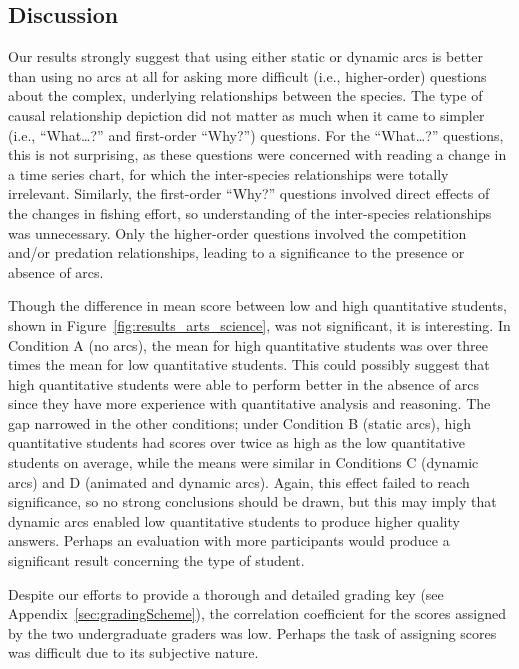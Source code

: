 \subsection{Discussion}

Our results strongly suggest that using either static or dynamic arcs is better than using no arcs at all for asking more difficult (i.e., higher-order) questions about the complex, underlying relationships between the species.  The type of causal relationship depiction did not matter as much when it came to simpler (i.e., ``What\ldots?'' and first-order ``Why?'') questions.  For the ``What\ldots?'' questions, this is not surprising, as these questions were concerned with reading a change in a time series chart, for which the inter-species relationships were totally irrelevant.  Similarly, the first-order ``Why?'' questions involved direct effects of the changes in fishing effort, so understanding of the inter-species relationships was unnecessary.  Only the higher-order questions involved the competition and/or predation relationships, leading to a significance to the presence or absence of arcs.

Though the difference in mean score between low and high quantitative students, shown in Figure~\ref{fig:results_arts_science}, was not significant, it is interesting.  In Condition A (no arcs), the mean for high quantitative students was over three times the mean for low quantitative students.  This could possibly suggest that high quantitative students were able to perform better in the absence of arcs since they have more experience with quantitative analysis and reasoning.  The gap narrowed in the other conditions; under Condition B (static arcs), high quantitative students had scores over twice as high as the low quantitative students on average, while the means were similar in Conditions C (dynamic arcs) and D (animated and dynamic arcs).  Again, this effect failed to reach significance, so no strong conclusions should be drawn, but this may imply that dynamic arcs enabled low quantitative students to produce higher quality answers.  Perhaps an evaluation with more participants would produce a significant result concerning the type of student.

Despite our efforts to provide a thorough and detailed grading key (see Appendix~\ref{sec:gradingScheme}), the correlation coefficient for the scores assigned by the two undergraduate graders was low.  Perhaps the task of assigning scores was difficult due to its subjective nature.  

